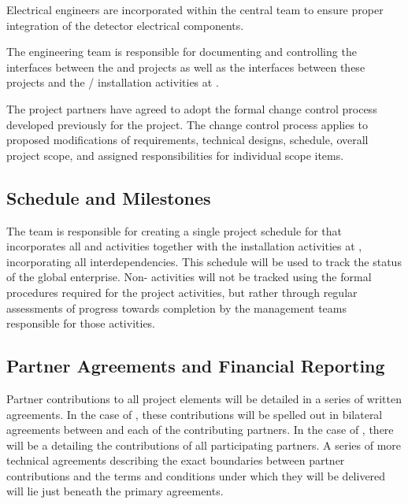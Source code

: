 Electrical engineers are incorporated within the central  
team to ensure proper integration of the detector electrical 
components. 

The  engineering team is responsible for documenting and
controlling the interfaces between the  and  
projects as well as the interfaces between these projects and the 
/  installation activities at .  

The  project partners have agreed to adopt 
the formal change control process developed previously for the 
 project.  The change control process applies to 
proposed modifications of requirements, technical designs, 
schedule, overall project scope, and assigned responsibilities 
for individual scope items. 

\subsection{Schedule and Milestones}   %
\label{sec:dune_schedule}

The  team is responsible for creating a single project
schedule for  that incorporates all  and
 activities together with the installation activities at
, incorporating all interdependencies.  This schedule
will be used to track the status of the global enterprise.   Non- activities will not be 
tracked using the formal  procedures required for the 
 project activities, but rather through regular assessments 
of progress towards completion by the management teams responsible 
for those activities. 



\subsection{Partner Agreements and Financial Reporting}   %
\label{sec:dune_agreements}

Partner contributions to all project elements will be detailed 
in a series of written agreements.  In the case of , 
these contributions will be spelled out in bilateral agreements 
between  and each of the contributing partners.  In 
the case of , there will be a  
detailing the contributions of all participating partners.  
A series of more technical agreements describing the exact 
boundaries between partner contributions and the terms and 
conditions under which they will be delivered will lie just 
beneath the primary agreements.  


